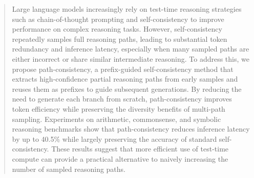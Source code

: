 \begin{abstract}
    Large language models increasingly rely on test-time reasoning strategies such as chain-of-thought prompting and self-consistency to improve performance on complex reasoning tasks. However, self-consistency repeatedly samples full reasoning paths, leading to substantial token redundancy and inference latency, especially when many sampled paths are either incorrect or share similar intermediate reasoning. To address this, we propose path-consistency, a prefix-guided self-consistency method that extracts high-confidence partial reasoning paths from early samples and reuses them as prefixes to guide subsequent generations. By reducing the need to generate each branch from scratch, path-consistency improves token efficiency while preserving the diversity benefits of multi-path sampling. Experiments on arithmetic, commonsense, and symbolic reasoning benchmarks show that path-consistency reduces inference latency by up to 40.5\% while largely preserving the accuracy of standard self-consistency. These results suggest that more efficient use of test-time compute can provide a practical alternative to naively increasing the number of sampled reasoning paths.
\end{abstract}

